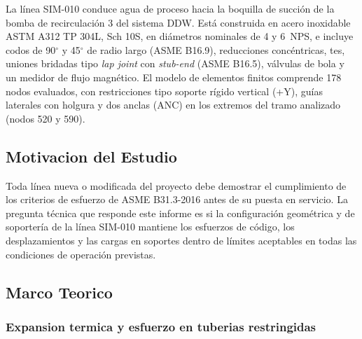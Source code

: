 La l\'{i}nea SIM-010 conduce agua de proceso hacia la boquilla de succi\'{o}n de
la bomba de recirculaci\'{o}n 3 del sistema DDW. Est\'{a} construida en acero
inoxidable ASTM A312 TP 304L, Sch 10S, en di\'{a}metros nominales de 4 y 6~NPS,
e incluye codos de 90$^\circ$ y 45$^\circ$ de radio largo (ASME B16.9),
reducciones conc\'{e}ntricas, tes, uniones bridadas tipo \textit{lap joint} con
\textit{stub-end} (ASME B16.5), v\'{a}lvulas de bola y un medidor de flujo
magn\'{e}tico. El modelo de elementos finitos comprende 178 nodos evaluados, con
restricciones tipo soporte r\'{i}gido vertical (+Y), gu\'{i}as laterales con
holgura y dos anclas (ANC) en los extremos del tramo analizado (nodos 520 y
590).

\subsection{Motivacion del Estudio}

Toda l\'{i}nea nueva o modificada del proyecto debe demostrar el cumplimiento de
los criterios de esfuerzo de ASME B31.3-2016 antes de su puesta en servicio.
La pregunta t\'{e}cnica que responde este informe es si la configuraci\'{o}n
geom\'{e}trica y de soporter\'{i}a de la l\'{i}nea SIM-010 mantiene los esfuerzos
de c\'{o}digo, los desplazamientos y las cargas en soportes dentro de l\'{i}mites
aceptables en todas las condiciones de operaci\'{o}n previstas.

\subsection{Marco Teorico}
\label{ssec:marco}

\subsubsection{Expansion termica y esfuerzo en tuberias restringidas}

